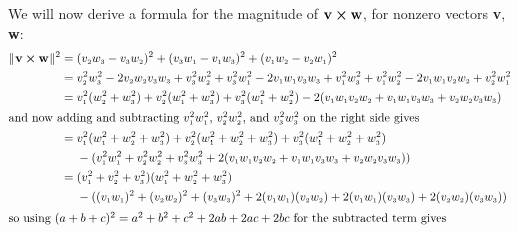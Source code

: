 We will now derive a formula for the magnitude of $\textbf{v} \bm{\times} \textbf{w}$, for nonzero vectors \textbf{v},
\textbf{w}:
\begin{align*}\begin{split}
 \norm{\Crossprod{\textbf{v}}{\textbf{w}}}^2 &= (\ssub{v}{2}\ssub{w}{3} - \ssub{v}{3}\ssub{w}{2})^2 +
  (\ssub{v}{3}\ssub{w}{1} - \ssub{v}{1}\ssub{w}{3})^2 + (\ssub{v}{1}\ssub{w}{2} - \ssub{v}{2}\ssub{w}{1})^2\\
  &= \ssub{v}{2}^{2}\ssub{w}{3}^{2} - 2\ssub{v}{2}\ssub{w}{2}\ssub{v}{3}\ssub{w}{3} + \ssub{v}{3}^{2}\ssub{w}{2}^{2} +
  \ssub{v}{3}^{2}\ssub{w}{1}^{2} - 2\ssub{v}{1}\ssub{w}{1}\ssub{v}{3}\ssub{w}{3} + \ssub{v}{1}^{2}\ssub{w}{3}^{2} +
  \ssub{v}{1}^{2}\ssub{w}{2}^{2} - 2\ssub{v}{1}\ssub{w}{1}\ssub{v}{2}\ssub{w}{2} + \ssub{v}{2}^{2}\ssub{w}{1}^{2}\\
  &= \ssub{v}{1}^{2}(\ssub{w}{2}^{2} + \ssub{w}{3}^{2}) + \ssub{v}{2}^{2}(\ssub{w}{1}^{2} + \ssub{w}{3}^{2}) +
  \ssub{v}{3}^{2}(\ssub{w}{1}^{2} + \ssub{w}{2}^{2})
   - 2(\ssub{v}{1}\ssub{w}{1}\ssub{v}{2}\ssub{w}{2} +
     \ssub{v}{1}\ssub{w}{1}\ssub{v}{3}\ssub{w}{3} + \ssub{v}{2}\ssub{w}{2}\ssub{v}{3}\ssub{w}{3})\\
  \intertext{and now adding and subtracting $\ssub{v}{1}^{2}\ssub{w}{1}^{2}$, $\ssub{v}{2}^{2}\ssub{w}{2}^{2}$, and
  $\ssub{v}{3}^{2}\ssub{w}{3}^{2}$ on the right side gives}
  &= \ssub{v}{1}^{2}(\ssub{w}{1}^{2} + \ssub{w}{2}^{2} + \ssub{w}{3}^{2}) +
  \ssub{v}{2}^{2}(\ssub{w}{1}^{2} + \ssub{w}{2}^{2} + \ssub{w}{3}^{2}) +
  \ssub{v}{3}^{2}(\ssub{w}{1}^{2} + \ssub{w}{2}^{2} + \ssub{w}{3}^{2})\\
  &\mathrel{\phantom{=}} {} - (\ssub{v}{1}^{2}\ssub{w}{1}^{2} + \ssub{v}{2}^{2}\ssub{w}{2}^{2} +
   \ssub{v}{3}^{2}\ssub{w}{3}^{2} + 2(\ssub{v}{1}\ssub{w}{1}\ssub{v}{2}\ssub{w}{2} +
   \ssub{v}{1}\ssub{w}{1}\ssub{v}{3}\ssub{w}{3} + \ssub{v}{2}\ssub{w}{2}\ssub{v}{3}\ssub{w}{3}))\\
  &= (\ssub{v}{1}^{2} + \ssub{v}{2}^{2} + \ssub{v}{3}^{2})(\ssub{w}{1}^{2} + \ssub{w}{2}^{2} + \ssub{w}{3}^{2})\\
  &\mathrel{\phantom{=}} {} - ((\ssub{v}{1}\ssub{w}{1})^2 + (\ssub{v}{2}\ssub{w}{2})^2 + (\ssub{v}{3}\ssub{w}{3})^2 +
   2(\ssub{v}{1}\ssub{w}{1})(\ssub{v}{2}\ssub{w}{2}) + 2(\ssub{v}{1}\ssub{w}{1})(\ssub{v}{3}\ssub{w}{3}) +
   2(\ssub{v}{2}\ssub{w}{2})(\ssub{v}{3}\ssub{w}{3}))\end{split}\\
  \intertext{so using $(a + b + c)^2 = a^2 + b^2 + c^2 + 2ab + 2ac + 2bc$ for the subtracted term gives}

\end{align*}
